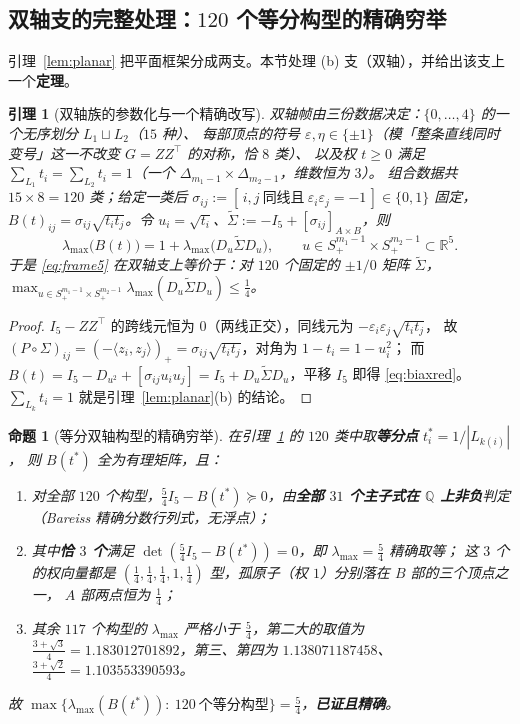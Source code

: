 \documentclass[UTF8,11pt]{ctexart}
\newtheorem{proposition}[theorem]{命题}
\newtheorem{lemma}[theorem]{引理}
\theoremstyle{definition}
\newcommand{\R}{\mathbb{R}}
\newcommand{\Q}{\mathbb{Q}}
\begin{document}
\subsection{双轴支的完整处理：$120$ 个等分构型的精确穷举}\label{sec:biax}

引理~\ref{lem:planar} 把平面框架分成两支。本节处理 (b) 支（双轴），并给出该支上一个\textbf{定理}。

\begin{lemma}[双轴族的参数化与一个精确改写]\label{lem:biaxparam}
双轴帧由三份数据决定：$\{0,\dots,4\}$ 的一个无序划分 $L_1\sqcup L_2$（$15$ 种）、
每部顶点的符号 $\varepsilon,\eta\in\{\pm1\}$（模「整条直线同时变号」这一不改变 $G=ZZ^\top$ 的对称，恰 $8$ 类）、
以及权 $t\ge0$ 满足 $\sum_{L_1}t_i=\sum_{L_2}t_i=1$（一个 $\Delta_{m_1-1}\times\Delta_{m_2-1}$，维数恒为 $3$）。
组合数据共 $15\times8=120$ 类；给定一类后 $\sigma_{ij}:=[\,i,j\ \text{同线且}\ \varepsilon_i\varepsilon_j=-1\,]\in\{0,1\}$ 固定，
$B(t)_{ij}=\sigma_{ij}\sqrt{t_it_j}$。令 $u_i=\sqrt{t_i}$、$\widetilde\Sigma:=-I_5+[\sigma_{ij}]_{A\times B}$，则
\begin{equation}\label{eq:biaxred}
\lambda_{\max}\bigl(B(t)\bigr)=1+\lambda_{\max}\bigl(D_u\widetilde\Sigma D_u\bigr),
\qquad u\in S^{m_1-1}_+\times S^{m_2-1}_+\subset\R^5 .
\end{equation}
于是 \eqref{eq:frame5} 在双轴支上等价于：对 $120$ 个固定的 $\pm1/0$ 矩阵 $\widetilde\Sigma$，
$\max_{u\in S^{m_1-1}_+\times S^{m_2-1}_+}\lambda_{\max}(D_u\widetilde\Sigma D_u)\le\frac14$。
\end{lemma}

\begin{proof}
$I_5-ZZ^\top$ 的跨线元恒为 $0$（两线正交），同线元为 $-\varepsilon_i\varepsilon_j\sqrt{t_it_j}$，
故 $(P\circ\Sigma)_{ij}=(-\langle z_i,z_j\rangle)_+=\sigma_{ij}\sqrt{t_it_j}$，对角为 $1-t_i=1-u_i^2$；
而 $B(t)=I_5-D_{u^2}+[\sigma_{ij}u_iu_j]=I_5+D_u\widetilde\Sigma D_u$，平移 $I_5$ 即得 \eqref{eq:biaxred}。
$\sum_{L_k}t_i=1$ 就是引理~\ref{lem:planar}(b) 的结论。
\end{proof}

\begin{proposition}[等分双轴构型的精确穷举]\label{prop:biaxenum}
在引理~\ref{lem:biaxparam} 的 $120$ 类中取\textbf{等分点} $t^\ast_i=1/|L_{k(i)}|$，
则 $B(t^\ast)$ 全为有理矩阵，且：
\begin{enumerate}[label=(\roman*),leftmargin=2em]
\item 对全部 $120$ 个构型，$\frac54I_5-B(t^\ast)\succeq0$，由\textbf{全部 $31$ 个主子式在 $\Q$ 上非负}判定
（Bareiss 精确分数行列式，无浮点）；
\item 其中\textbf{恰 $3$ 个}满足 $\det(\frac54I_5-B(t^\ast))=0$，即 $\lambda_{\max}=\frac54$ 精确取等；
这 $3$ 个的权向量都是 $(\frac14,\frac14,\frac14,1,\frac14)$ 型，孤原子（权 $1$）分别落在 $B$ 部的三个顶点之一，
$A$ 部两点恒为 $\frac14$；
\item 其余 $117$ 个构型的 $\lambda_{\max}$ 严格小于 $\frac54$，第二大的取值为
$\frac{3+\sqrt3}{4}=1.183012701892$，第三、第四为 $1.138071187458$、$\frac{3+\sqrt2}{4}=1.103553390593$。
\end{enumerate}
故 $\max\{\lambda_{\max}(B(t^\ast)):\ 120\ \text{个等分构型}\}=\frac54$，\textbf{已证且精确}。
\end{proposition}
\end{document}
